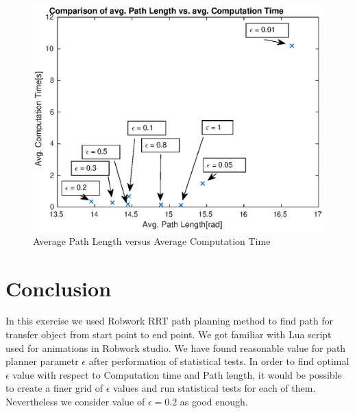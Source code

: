 \documentclass[11pt]{article}
\numberwithin{equation}{section}
\begin{document}
\begin{figure}[h]
	\centering
	\includegraphics[width = 16cm]{fig/PathVsTime.eps}
	\caption{Average Path Length versus Average Computation Time}
	\label{fig::avepathlenvsavecomptime}
\end{figure}

\section{Conclusion}
In this exercise we used Robwork RRT path planning method to find path for transfer object from start point to end point. We got familiar with Lua script used for animations in Robwork studio. We have found reasonable value for path planner parametr $\epsilon$ after performation of statistical tests. In order to find optimal $\epsilon$ value with respect to Computation time and Path length, it would be possible to create a finer grid of $\epsilon$ values and run statistical tests for each of them. Nevertheless we consider value of $\epsilon = 0.2$ as good enough.
\end{document}
